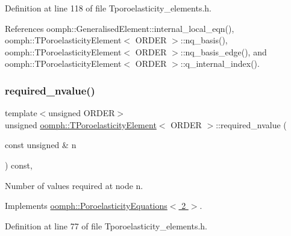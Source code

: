 Definition at line 118 of file Tporoelasticity\+\_\+elements.\+h.



References oomph\+::\+Generalised\+Element\+::internal\+\_\+local\+\_\+eqn(), oomph\+::\+T\+Poroelasticity\+Element$<$ O\+R\+D\+E\+R $>$\+::nq\+\_\+basis(), oomph\+::\+T\+Poroelasticity\+Element$<$ O\+R\+D\+E\+R $>$\+::nq\+\_\+basis\+\_\+edge(), and oomph\+::\+T\+Poroelasticity\+Element$<$ O\+R\+D\+E\+R $>$\+::q\+\_\+internal\+\_\+index().

\mbox{\label{classoomph_1_1TPoroelasticityElement_a03e370454fbf25ba5d57c0e9e5d95062}} 
\subsubsection{\texorpdfstring{required\+\_\+nvalue()}{required\_nvalue()}}
{\footnotesize\ttfamily template$<$unsigned O\+R\+D\+ER$>$ \\
unsigned \hyperlink{classoomph_1_1TPoroelasticityElement}{oomph\+::\+T\+Poroelasticity\+Element}$<$ O\+R\+D\+ER $>$\+::required\+\_\+nvalue (\begin{DoxyParamCaption}\item[{const unsigned \&}]{n }\end{DoxyParamCaption}) const\hspace{0.3cm}{\ttfamily [inline]}, {\ttfamily [virtual]}}



Number of values required at node n. 



Implements \hyperlink{classoomph_1_1PoroelasticityEquations_ab22159684bdf5fdfe1591fb2afea1e95}{oomph\+::\+Poroelasticity\+Equations$<$ 2 $>$}.



Definition at line 77 of file Tporoelasticity\+\_\+elements.\+h.

\mbox{\label{classoomph_1_1TPoroelasticityElement_a46bdd198a1675b743674964c79396db1}} 
